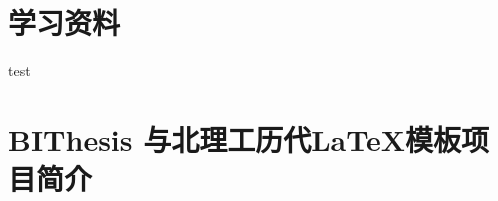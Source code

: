 \begin{appendices}
  \chapter{学习资料}
  test
  \chapter{BIThesis 与北理工历代\LaTeX{}模板项目简介}
\end{appendices}
